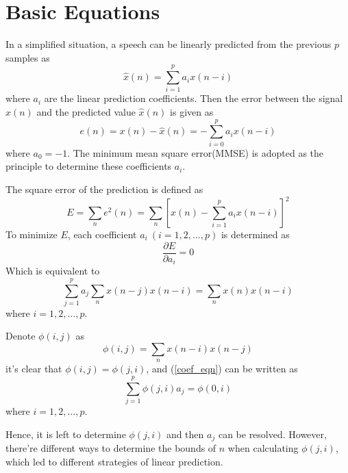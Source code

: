 \documentclass[preprint,12pt]{elsarticle}
\begin{document}
\section{Basic Equations}
\label{S:1}
In a simplified situation, a speech can be linearly predicted from the previous $p$ samples as
\begin{equation}
	\hat{x}(n) =  \sum_{i=1}^{p} a_i x(n-i)
\end{equation}
where $a_i$ are the linear prediction coefficients. Then the error between the signal $x(n)$ and the predicted value $\hat{x}(n)$ is given as
\begin{equation}
	e(n) = x(n) - \hat{x}(n) = -\sum_{i=0}^{p}a_i x(n-i)
\end{equation}
where $a_0 = -1$. The minimum mean square error(MMSE) is adopted as the principle to determine these coefficients $a_i$.

The square error of the prediction is defined as
\begin{equation}
	E = \sum_{n}e^2(n) = \sum_{n}[x(n) - \sum_{i=1}^{p}a_i x(n-i)]^2
\end{equation}
To minimize $E$, each coefficient $a_i\ (i = 1, 2, ..., p)$ is determined as
\begin{equation}
	\frac{\partial E}{\partial a_i} = 0
\end{equation}
Which is equivalent to
\begin{equation}\label{coef_eqn}
	\sum_{j=1}^{p}a_j \sum_{n}x(n-j)x(n-i) = \sum_{n}x(n)x(n-i)
\end{equation}
where $i= 1, 2, ..., p$.

Denote $\phi(i,j)$ as
\begin{equation}\label{phi_def}
	\phi(i, j) = \sum_{n}x(n-i)x(n-j) 
\end{equation}
it's clear that $\phi(i,j) = \phi(j, i)$, and (\ref{coef_eqn}) can be written as
\begin{equation}
	\sum_{j=1}^{p} \phi(j, i)a_j = \phi(0, i)
\end{equation}
where $i= 1, 2, ..., p$.

Hence, it is left to determine $\phi(j, i)$ and then $a_j$ can be resolved. However, there're different ways to determine the bounds of $n$ when calculating $\phi(j, i)$, which led to different strategies of linear prediction.
\end{document}

